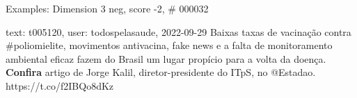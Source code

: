 \begin{frame}{Examples: Dimension 3 neg, score -2, \# 000032}
\footnotesize
\begin{alertblock}{text: t005120, user: todospelasaude, 2022-09-29}
Baixas taxas de vacinação contra \#poliomielite, movimentos antivacina, fake 
news e a falta de monitoramento ambiental eficaz fazem do Brasil um lugar 
propício para a volta da doença. \textbf{Confira} artigo de Jorge Kalil, 
diretor-presidente do ITpS, no @Estadao. https://t.co/f2IBQo8dKz 
\end{alertblock}
\end{frame}
